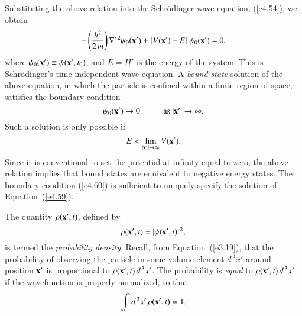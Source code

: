 Substituting the above relation into the  Schr\"{o}dinger wave equation, 
(\ref{e4.54}), we
obtain
\begin{equation}\label{e4.59}
-\left(\frac{\hbar^2}{2\,m}\right)\nabla'^{\,2}\psi_0({\bf x'}) + 
[V({\bf x'})-E]\,\psi_0({\bf x'}) =0,
\end{equation}
where $\psi_0({\bf x'}) \equiv \psi({\bf x'}, t_0)$,
and $E= H'$ is the energy of the system. This is Schr\"{o}dinger's
time-independent wave equation. A {\em bound state}\/ solution of the
above equation, in which the particle is confined within a finite region
of space, satisfies the boundary condition
\begin{equation}\label{e4.60}
\psi_0({\bf x}') \rightarrow 0 \mbox{\hspace{1cm}as $|{\bf x}'|\rightarrow \infty$}.
\end{equation}
Such a solution is only possible if
\begin{equation}
E < \lim_{|{\bf x}'|\rightarrow \infty} V({\bf x'}).
\end{equation}
Since it is conventional to set the potential at infinity equal to zero, the above
relation implies that bound states are equivalent to negative energy states.
The boundary condition (\ref{e4.60}) is sufficient to uniquely specify the solution
of Equation~(\ref{e4.59}).

The quantity $\rho({\bf x'}, t)$, defined by
\begin{equation}
\rho({\bf x'}, t) = |\psi({\bf x'}, t)|^{\,2},
\end{equation}
is termed the {\em probability density}. Recall, from Equation~(\ref{e3.19}), that the
probability of observing the particle in some volume element $d^{\,3} x'$ 
around position ${\bf x'}$ is proportional to $\rho({\bf x'}, t)\,d^{\,3} x'$.
The probability is {\em equal}\/ to $\rho({\bf x'}, t)\,d^{\,3} x'$ if the wavefunction
is properly normalized, so that
\begin{equation}\label{e4.63}
\int d^{\,3} x'\,\rho({\bf x'}, t) = 1.
\end{equation}

